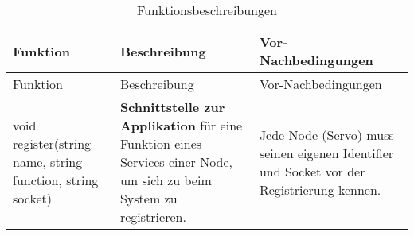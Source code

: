 \begin{longtable}{|>{\raggedright\arraybackslash}p{4cm}|>{\raggedright\arraybackslash}p{5cm}|>{\raggedright\arraybackslash}p{5cm}|}
	\caption{Funktionsbeschreibungen} \label{tab:loesungsstrategie} \\
	\hline
	Funktion & Beschreibung & Vor-Nachbedingungen \\
	\hline
	\endfirsthead
	
	\hline
	Funktion & Beschreibung & Vor-Nachbedingungen \\
	\hline
	\endhead
	
	\hline
	\endfoot
	
	
	void register(string name, string function, string socket) & 
	\textbf{Schnittstelle zur Applikation} für eine Funktion eines Services einer Node, um sich zu beim System zu registrieren. 
	& Jede Node (Servo) muss seinen eigenen Identifier und Socket vor der Registrierung kennen. 
	\\
	\hline
	

\end{longtable}
